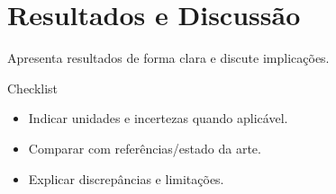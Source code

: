 \section{Resultados e Discussão}
\label{sec:results}

Apresenta resultados de forma clara e discute implicações.

\begin{exampleblock}{Checklist}
\begin{itemize}
  \item Indicar unidades e incertezas quando aplicável.
  \item Comparar com referências/estado da arte.
  \item Explicar discrepâncias e limitações.
\end{itemize}
\end{exampleblock}
